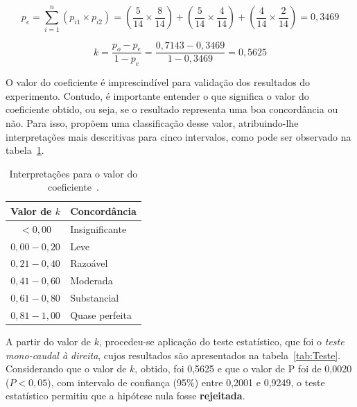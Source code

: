 \begin{displaymath}
  p_{e} = 
  \displaystyle\sum_{i=1}^{n}(p_{i1} \times p_{i2}) = 
  \left(\frac{5}{14} \times \frac{8}{14}\right) + 
  \left(\frac{5}{14} \times \frac{4}{14}\right) + 
  \left(\frac{4}{14} \times \frac{2}{14}\right) = 0,3469
\end{displaymath}

\begin{displaymath}
  k = \frac{p_{o} - p_{e}}{1 - p_{e}} =
  \frac{0,7143 - 0,3469}{1 - 0,3469} = 0,5625
\end{displaymath}

O valor do coeficiente  é imprescindível para validação dos resultados
do experimento. Contudo, é importante entender o que significa o valor
do  coeficiente obtido,  ou seja,  se o  resultado representa  uma boa
concordância ou não.  Para isso,  propõem
uma  classificação  desse  valor, atribuindo-lhe  interpretações  mais
descritivas  para  cinco  intervalos,   como  pode  ser  observado  na
tabela~\ref{tab:Agreement}.

\begin{table}[!htb]
 \begin{center}

   \begin{tabular}{cl} \hline

     {\bf Valor de $k$} & {\bf Concordância} \\ \hline
      $<0,00$     & Insignificante \\
      $0,00-0,20$ & Leve \\ 
      $0,21-0,40$ & Razoável \\ 
      $0,41-0,60$ & Moderada \\ 
      $0,61-0,80$ & Substancial \\ 
      $0,81-1,00$ & Quase perfeita \\ \hline

   \end{tabular}
   \caption{Interpretações        para        o        valor        do
     coeficiente~\cite[p.~165]{Landis:Koch:1977}.}
   \label{tab:Agreement}
 \end{center}
\end{table}

A partir do valor de  $k$, procedeu-se aplicação do teste estatístico,
que  foi o  {\em teste  mono-caudal à  direita}, cujos  resultados são
apresentados na  tabela~\ref{tab:Teste}.  Considerando que  o valor de
$k$, obtido, foi  0,5625 e que o valor de P  foi de 0,0020 ($P<0,05$),
com  intervalo de  confiança (95\%)  entre  0,2001 e  0,9249, o  teste
estatístico permitiu que a hipótese nula fosse {\bf rejeitada}.

